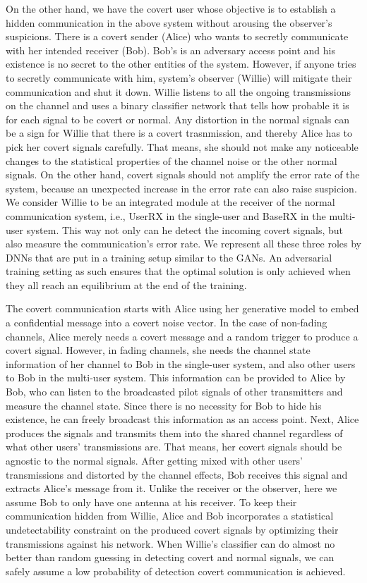 On the other hand, we have the covert user whose objective is to establish a hidden communication in the above system without arousing the observer's suspicions. There is a covert sender (Alice) who wants to secretly communicate with her intended receiver (Bob). Bob's is an adversary access point and his existence is no secret to the other entities of the system. However, if anyone tries to secretly communicate with him, system's observer (Willie) will mitigate their communication and shut it down. Willie listens to all the ongoing transmissions on the channel and uses a binary classifier network that tells how probable it is for each signal to be covert or normal. Any distortion in the normal signals can be a sign for Willie that there is a covert trasnmission, and thereby Alice has to pick her covert signals carefully. That means, she should not make any noticeable changes to the statistical properties of the channel noise or the other normal signals. On the other hand, covert signals should not  amplify the error rate of the system, because an unexpected increase in the error rate can also raise suspicion. We consider Willie to be an integrated module at the receiver of the normal communication system, i.e., UserRX in the single-user and BaseRX in the multi-user system. This way not only can he detect the incoming covert signals, but also measure the communication's error rate. We represent all these three roles by DNNs that are put in a training setup similar to the GANs. An adversarial training setting as such ensures that the optimal solution is only achieved when they all reach an equilibrium at the end of the training.

The covert communication starts with Alice using her generative model to embed a confidential message into a covert noise vector. In the case of non-fading channels, Alice merely needs a covert message and a random trigger to produce a covert signal. However, in fading channels, she needs the channel state information of her channel to Bob in the single-user system, and also other users to Bob in the multi-user system. This information can be provided to Alice by Bob, who can listen to the broadcasted pilot signals of other transmitters and measure the channel state. Since there is no necessity for Bob to hide his existence, he can freely broadcast this information as an access point. Next, Alice produces the signals and transmits them into the shared channel regardless of what other users' transmissions are. That means, her covert signals should be agnostic to the normal signals. After getting mixed with other users' transmissions and distorted by the channel effects, Bob receives this signal and extracts Alice's message from it. Unlike the receiver or the observer, here we assume Bob to only have one antenna at his receiver. To keep their communication hidden from Willie, Alice and Bob incorporates a statistical undetectability constraint on the produced covert signals by optimizing their transmissions against his network. When Willie's classifier can do almost no better than random guessing in detecting covert and normal signals, we can safely assume a low probability of detection covert communication is achieved.


